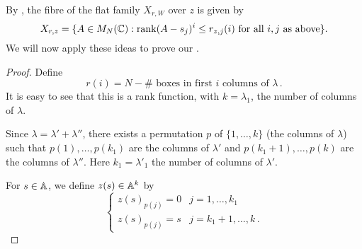 \documentclass{article} %
\begin{document}
% 
By \cite[Corollary 2.2]{eisenbud1989rank}, the fibre of the flat family $ X_{r,W} $ over $ z$ is given by
\begin{equation} 
    \label{eq:ESfibre}
    X_{r,z} = \{ A \in M_N(\CC) :\rk (A-s_j)^i\le r_{z,j}(i) \text{ for all } i , j \text{ as above}\}.
\end{equation}
% 
We will now apply these ideas to prove our .
% 
\begin{proof}
% 
% 
Define 
$$
    r(i) = N - \#\text{~boxes in first $i$ columns of }\lambda\,.
$$
It is easy to see that this is a rank function, with $ k = \lambda_1$, the number of columns of $ \lambda$.

Since $\lambda = \lambda' + \lambda''$, there exists a permutation $ p $ of $ \{1, \dots, k\}$ (the columns of $ \lambda$) such that $ p(1), \dots, p(k_1) $ are the columns of $ \lambda'$ and $ p(k_1+1), \dots, p(k)$ are the columns of $ \lambda''$. Here $ k_1 = \lambda'_1$ the number of columns of $ \lambda'$.

For $ s \in \AA$, we define $ z(s) \in \AA^k$ by 
\[
\begin{cases}
    z(s)_{p(j)} = 0 &  j = 1, \dots, k_1 \\
    z(s)_{p(j)} = s & j = k_1 + 1, \dots, k\,.
\end{cases}    
\]


\end{proof}
\end{document}
